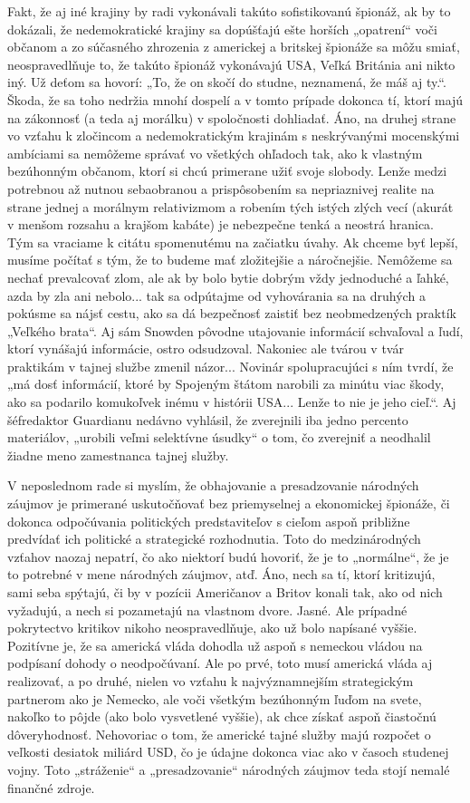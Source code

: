 \documentclass{article}
\begin{document}
Fakt, že aj iné krajiny by radi vykonávali takúto sofistikovanú špionáž, ak by to dokázali, že nedemokratické krajiny sa dopúšťajú ešte horších „opatrení“ voči občanom a zo súčasného zhrozenia z americkej a britskej špionáže sa môžu smiať, neospravedlňuje to, že takúto špionáž vykonávajú USA, Veľká Británia ani nikto iný. Už deťom sa hovorí: „To, že on skočí do studne, neznamená, že máš aj ty.“. Škoda, že sa toho nedržia mnohí dospelí a v tomto prípade dokonca tí, ktorí majú na zákonnosť (a teda aj morálku) v spoločnosti dohliadať. Áno, na druhej strane vo vzťahu k zločincom a nedemokratickým krajinám s neskrývanými mocenskými ambíciami sa nemôžeme správať vo všetkých ohľadoch tak, ako k vlastným bezúhonným občanom, ktorí si chcú primerane užiť svoje slobody. Lenže medzi potrebnou až nutnou sebaobranou a prispôsobením sa nepriaznivej realite na strane jednej a morálnym relativizmom a robením tých istých zlých vecí (akurát v menšom rozsahu a krajšom kabáte) je nebezpečne tenká a neostrá hranica. Tým sa vraciame k citátu spomenutému na začiatku úvahy. Ak chceme byť lepší, musíme počítať s tým, že to budeme mať zložitejšie a náročnejšie. Nemôžeme sa nechať prevalcovať zlom, ale ak by bolo bytie dobrým vždy jednoduché a ľahké, azda by zla ani nebolo... tak sa odpútajme od vyhovárania sa na druhých a pokúsme sa nájsť cestu, ako sa dá bezpečnosť zaistiť bez neobmedzených praktík „Veľkého brata“. Aj sám Snowden pôvodne utajovanie informácií schvaľoval a ľudí, ktorí vynášajú informácie, ostro odsudzoval. Nakoniec ale tvárou v tvár praktikám v tajnej službe zmenil názor... Novinár spolupracujúci s ním tvrdí, že „má dosť informácií, ktoré by Spojeným štátom narobili za minútu viac škody, ako sa podarilo komukoľvek inému v histórii USA... Lenže to nie je jeho cieľ.“. Aj šéfredaktor Guardianu nedávno vyhlásil, že zverejnili iba jedno percento materiálov, „urobili veľmi selektívne úsudky“ o tom, čo zverejniť a neodhalil žiadne meno zamestnanca tajnej služby.

V neposlednom rade si myslím, že obhajovanie a presadzovanie národných záujmov je primerané uskutočňovať bez priemyselnej a ekonomickej špionáže, či dokonca odpočúvania politických predstaviteľov s cieľom aspoň približne predvídať ich politické a strategické rozhodnutia. Toto do medzinárodných vzťahov naozaj nepatrí, čo ako niektorí budú hovoriť, že je to „normálne“, že je to potrebné v mene národných záujmov, atď. Áno, nech sa tí, ktorí kritizujú, sami seba spýtajú, či by v pozícii Američanov a Britov konali tak, ako od nich vyžadujú, a nech si pozametajú na vlastnom dvore. Jasné. Ale prípadné pokrytectvo kritikov nikoho neospravedlňuje, ako už bolo napísané vyššie. Pozitívne je, že sa americká vláda dohodla už aspoň s nemeckou vládou na podpísaní dohody o neodpočúvaní. Ale po prvé, toto musí americká vláda aj realizovať, a po druhé, nielen vo vzťahu k najvýznamnejším strategickým partnerom ako je Nemecko, ale voči všetkým bezúhonným ľuďom na svete, nakoľko to pôjde (ako bolo vysvetlené vyššie), ak chce získať aspoň čiastočnú dôveryhodnosť. Nehovoriac o tom, že americké tajné služby majú rozpočet o veľkosti desiatok miliárd USD, čo je údajne dokonca viac ako v časoch studenej vojny. Toto „stráženie“ a „presadzovanie“ národných záujmov teda stojí nemalé finančné zdroje.
\end{document}
